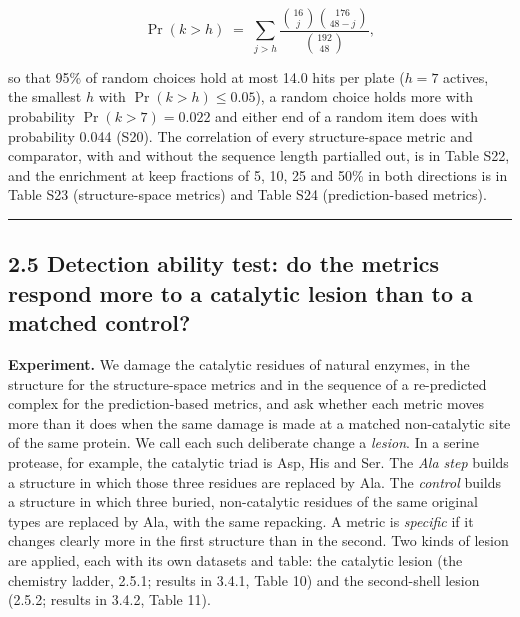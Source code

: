 \documentclass[
  10pt,
]{article}
\DeclareRobustCommand{\_}{\textunderscore\hspace{0pt}}
\begin{document}
\begin{equation*}\Pr(k > h) \;=\; \sum_{j > h}\frac{\binom{16}{j}\binom{176}{48-j}}{\binom{192}{48}} , \tag{17}\end{equation*}

so that 95\% of
random choices hold
at most 14.0 hits
per plate (\(h = 7\)
actives, the
smallest \(h\) with
\(\Pr(k > h) \le 0.05\)),
a random choice
holds more with
probability
\(\Pr(k > 7) = 0.022\)
and either end of a
random item does
with probability
0.044 (S20). The
correlation of every
structure-space
metric and
comparator, with and
without the sequence
length partialled
out, is in Table
S22, and the
enrichment at keep
fractions of 5, 10,
25 and 50\% in both
directions is in
Table S23
(structure-space
metrics) and Table
S24
(prediction-based
metrics).

\begin{center}\rule{0.5\linewidth}{0.5pt}\end{center}

\subsection{2.5
Detection ability
test: do the metrics
respond more to a
catalytic lesion
than to a matched
control?}

\textbf{Experiment.}
We damage the
catalytic residues
of natural enzymes,
in the structure for
the structure-space
metrics and in the
sequence of a
re-predicted complex
for the
prediction-based
metrics, and ask
whether each metric
moves more than it
does when the same
damage is made at a
matched
non-catalytic site
of the same protein.
We call each such
deliberate change a
\emph{lesion}. In a
serine protease, for
example, the
catalytic triad is
Asp, His and Ser.
The \emph{Ala step}
builds a structure
in which those three
residues are
replaced by Ala. The
\emph{control}
builds a structure
in which three
buried,
non-catalytic
residues of the same
original types are
replaced by Ala,
with the same
repacking. A metric
is \emph{specific}
if it changes
clearly more in the
first structure than
in the second. Two
kinds of lesion are
applied, each with
its own datasets and
table: the catalytic
lesion (the
chemistry ladder,
2.5.1; results in
3.4.1, Table 10) and
the second-shell
lesion (2.5.2;
results in 3.4.2,
Table 11).
\end{document}
